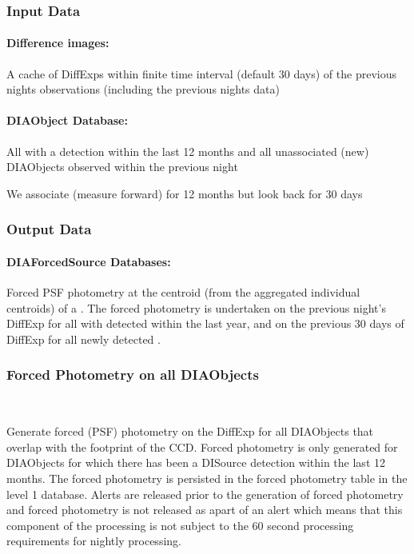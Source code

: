 \subsubsection{Input Data}

\paragraph*{Difference images:} A cache of DiffExps within finite time interval (default 30 days) of the previous nights observations (including the previous nights data)

\paragraph*{DIAObject Database:} All \DIAObjects with a \DIASource detection within the last 12 months and all unassociated (new) DIAObjects observed within the previous night

\begin{note} We associate (measure forward) for 12 months but look back for 30 days\end{note}

\subsubsection{Output Data}

\paragraph*{DIAForcedSource Databases:} Forced PSF photometry at the centroid (from the aggregated individual \DIASource centroids) of a \DIAObject. The forced photometry is undertaken on the previous night's DiffExp for all \DIAObjects with \DIASources detected within the last year, and on the previous 30 days of DiffExp for all newly detected \DIASources.


\subsubsection{Forced Photometry on all DIAObjects}~

Generate forced (PSF) photometry on the DiffExp for all DIAObjects that overlap with the footprint of the CCD. Forced photometry is only generated for DIAObjects for which there has been a DISource detection within the last 12 months. The forced photometry is persisted in the forced photometry table in the level 1 database. Alerts are released prior to the generation of forced photometry and forced photometry is not released as apart of an alert which means that this component of the processing is not subject to the 60 second processing requirements for nightly processing.

